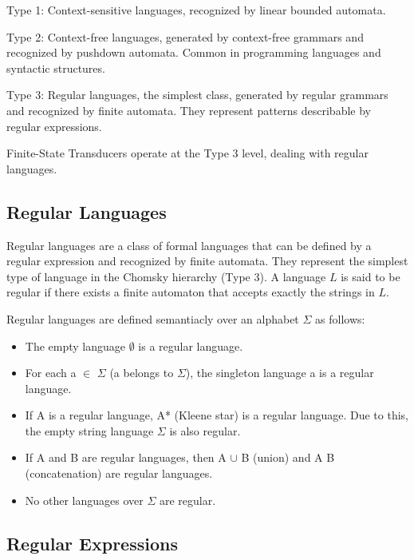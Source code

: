     Type 1: Context-sensitive languages, recognized by linear bounded automata.

    Type 2: Context-free languages, generated by context-free grammars and recognized by pushdown automata. Common in programming languages and syntactic structures.

    Type 3: Regular languages, the simplest class, generated by regular grammars and recognized by finite automata. They represent patterns describable by regular expressions.

Finite-State Transducers operate at the Type 3 level, dealing with regular languages.

\subsection{Regular Languages}

Regular languages are a class of formal languages that can be defined by a regular expression and recognized by finite automata. 
They represent the simplest type of language in the Chomsky hierarchy (Type 3). 
A language \( L \) is said to be regular if there exists a finite automaton that accepts exactly the strings in \( L \).

Regular languages are defined semantiacly over an alphabet \( \Sigma \) as follows:
\begin{itemize}
    \item The empty language \(\emptyset\) is a regular language.
    \item For each a \( \in \) \( \Sigma \) (a belongs to \( \Sigma \)), the singleton language {a} is a regular language.
    \item If A is a regular language, A* (Kleene star) is a regular language. Due to this, the empty string language {\( \Sigma \)} is also regular.
    \item If A and B are regular languages, then A \(\cup\) B (union) and A B (concatenation) are regular languages.
    \item No other languages over \( \Sigma \) are regular.
\end{itemize}

\subsection{Regular Expressions}

